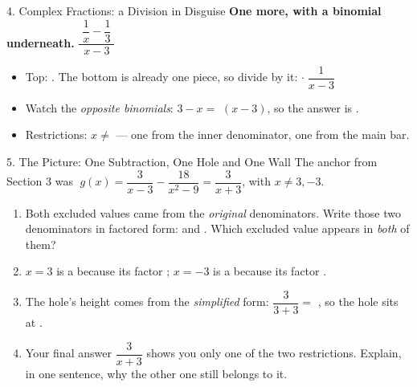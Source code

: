 \documentclass[10pt]{article}
\newcommand{\lgrid}[4]{%
  \draw[step=1, linegray!40, very thin] (#1,#3) grid (#2,#4);
  \draw[->, semithick, charcoal] (#1,0)--(#2,0) node[below right, font=\scriptsize]{$x$};
  \draw[->, semithick, charcoal] (0,#3)--(0,#4) node[left, font=\scriptsize]{$y$};}
\begin{document}
\begin{notesbox}{4. Complex Fractions: a Division in Disguise}
\vspace{5pt}
\textbf{One more, with a binomial underneath.} \;
$\dfrac{\;\dfrac{1}{x}-\dfrac{1}{3}\;}{\;x-3\;}$
\begin{itemize}[leftmargin=1.5em, itemsep=3pt]
  \item Top: . \; The bottom is already one piece, so divide by it:
         $\cdot\;\dfrac{1}{x-3}$
  \item Watch the \emph{opposite binomials}: $3-x=$ \ans{$-1\cdot$} $(x-3)$, so the answer is
        .
  \item Restrictions: $x\neq$  --- one from the inner denominator, one from the main bar.
\end{itemize}
\end{notesbox}

\begin{notesbox}{5. The Picture: One Subtraction, One Hole and One Wall}
The anchor from Section 3 was $\;g(x)=\dfrac{3}{x-3}-\dfrac{18}{x^2-9}=\dfrac{3}{x+3}$, with
$x\neq3,-3$.
\begin{center}
\end{center}
\begin{enumerate}[leftmargin=1.7em, itemsep=3pt]
  \item Both excluded values came from the \emph{original} denominators. Write those two denominators
        in factored form:  and . \; Which excluded value appears in
        \emph{both} of them? 
  \item $x=3$ is a  because its factor ; \; $x=-3$ is a
         because its factor .
  \item The hole's height comes from the \emph{simplified} form: $\dfrac{3}{3+3}=$ , so
        the hole sits at .
  \item Your final answer $\dfrac{3}{x+3}$ shows you only one of the two restrictions. Explain, in one
        sentence, why the other one still belongs to it. 
\end{enumerate}
\end{notesbox}
\end{document}
